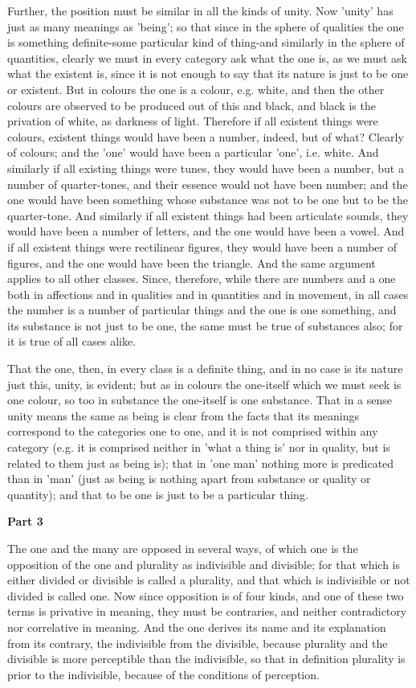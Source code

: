 Further, the position must be similar in all the kinds of unity. Now 'unity' has just as many meanings as 'being'; so that since in the sphere of qualities the one is something definite-some particular kind of thing-and similarly in the sphere of quantities, clearly we must in every category ask what the one is, as we must ask what the existent is, since it is not enough to say that its nature is just to be one or existent. But in colours the one is a colour, e.g. white, and then the other colours are observed to be produced out of this and black, and black is the privation of white, as darkness of light. Therefore if all existent things were colours, existent things would have been a number, indeed, but of what? Clearly of colours; and the 'one' would have been a particular 'one', i.e. white. And similarly if all existing things were tunes, they would have been a number, but a number of quarter-tones, and their essence would not have been number; and the one would have been something whose substance was not to be one but to be the quarter-tone. And similarly if all existent things had been articulate sounds, they would have been a number of letters, and the one would have been a vowel. And if all existent things were rectilinear figures, they would have been a number of figures, and the one would have been the triangle. And the same argument applies to all other classes. Since, therefore, while there are numbers and a one both in affections and in qualities and in quantities and in movement, in all cases the number is a number of particular things and the one is one something, and its substance is not just to be one, the same must be true of substances also; for it is true of all cases alike.

That the one, then, in every class is a definite thing, and in no case is its nature just this, unity, is evident; but as in colours the one-itself which we must seek is one colour, so too in substance the one-itself is one substance. That in a sense unity means the same as being is clear from the facts that its meanings correspond to the categories one to one, and it is not comprised within any category (e.g. it is comprised neither in 'what a thing is' nor in quality, but is related to them just as being is); that in 'one man' nothing more is predicated than in 'man' (just as being is nothing apart from substance or quality or quantity); and that to be one is just to be a particular thing.

\textbf{Part 3}

The one and the many are opposed in several ways, of which one is the opposition of the one and plurality as indivisible and divisible; for that which is either divided or divisible is called a plurality, and that which is indivisible or not divided is called one. Now since opposition is of four kinds, and one of these two terms is privative in meaning, they must be contraries, and neither contradictory nor correlative in meaning. And the one derives its name and its explanation from its contrary, the indivisible from the divisible, because plurality and the divisible is more perceptible than the indivisible, so that in definition plurality is prior to the indivisible, because of the conditions of perception.

